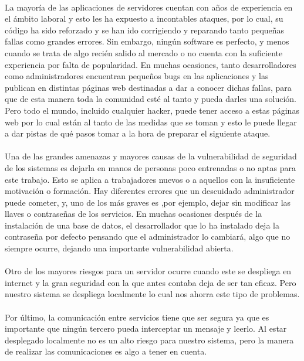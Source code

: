 \paragraph{}
La mayoría de las aplicaciones de servidores cuentan con años de
experiencia en el ámbito laboral y esto les ha expuesto a incontables
ataques, por lo cual, su código ha sido reforzado y se han ido
corrigiendo y reparando tanto pequeñas fallas como grandes
errores. Sin embargo, ningún software es perfecto, y menos cuando se
trata de algo recién salido al mercado o no cuenta con la suficiente
experiencia por falta de popularidad. En muchas ocasiones, tanto
desarrolladores como administradores encuentran pequeños bugs en las
aplicaciones y las publican en distintas páginas web destinadas a dar
a conocer dichas fallas, para que de esta manera toda la comunidad
esté al tanto y pueda darles una solución. Pero todo el mundo,
incluido cualquier hacker, puede tener acceso a estas páginas web por
lo cual están al tanto de las medidas que se toman y esto le puede
llegar a dar pistas de qué pasos tomar a la hora de preparar el
siguiente ataque.
\paragraph{}
Una de las grandes amenazas y mayores causas de la vulnerabilidad de
seguridad de los sistemas es dejarla en manos de personas poco
entrenadas o no aptas para este trabajo. Esto se aplica a trabajadores
nuevos o a aquellos con la insuficiente motivación o formación. Hay
diferentes errores que un descuidado administrador puede cometer, y,
uno de los más graves es ,por ejemplo, dejar sin modificar las llaves
o contraseñas de los servicios. En muchas ocasiones después de la
instalación de una base de datos, el desarrollador que lo ha instalado
deja la contraseña por defecto pensando que el administrador lo
cambiará, algo que no siempre ocurre, dejando una importante
vulnerabilidad abierta.
\paragraph{}
Otro de los mayores riesgos para un servidor ocurre cuando este se
despliega en internet y la gran seguridad con la que antes contaba
deja de ser tan eficaz. Pero nuestro sistema se despliega localmente
lo cual nos ahorra este tipo de problemas.
\paragraph{}
Por último, la comunicación entre servicios tiene que ser segura ya
que es importante que ningún tercero pueda interceptar un mensaje y
leerlo. Al estar desplegado localmente no es un alto riesgo para
nuestro sistema, pero la manera de realizar las comunicaciones es algo
a tener en cuenta.

